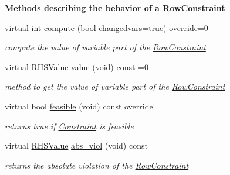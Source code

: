 \begin{Indent}\textbf{ Methods describing the behavior of a Row\+Constraint}\par
\begin{DoxyCompactItemize}
\item 
\mbox{\label{class_s_m_spp__di__unipi__it_1_1_row_constraint_a504d4e3e174c7a518cc66156a8a45ce5}} 
virtual int \mbox{\hyperlink{class_s_m_spp__di__unipi__it_1_1_row_constraint_a504d4e3e174c7a518cc66156a8a45ce5}{compute}} (bool changedvars=true) override=0
\begin{DoxyCompactList}\small\item\em compute the value of variable part of the \mbox{\hyperlink{class_s_m_spp__di__unipi__it_1_1_row_constraint}{Row\+Constraint}} \end{DoxyCompactList}\item 
virtual \mbox{\hyperlink{class_s_m_spp__di__unipi__it_1_1_row_constraint_a8813536ab3b13a81c8e83a999ade3bd8}{R\+H\+S\+Value}} \mbox{\hyperlink{class_s_m_spp__di__unipi__it_1_1_row_constraint_a42562ba0a608bdc52a80a2bb512d0603}{value}} (void) const =0
\begin{DoxyCompactList}\small\item\em method to get the value of variable part of the \mbox{\hyperlink{class_s_m_spp__di__unipi__it_1_1_row_constraint}{Row\+Constraint}} \end{DoxyCompactList}\item 
virtual bool \mbox{\hyperlink{class_s_m_spp__di__unipi__it_1_1_row_constraint_a508a569b1ce65668a4bbe261b0e2efab}{feasible}} (void) const override
\begin{DoxyCompactList}\small\item\em returns true if \mbox{\hyperlink{class_s_m_spp__di__unipi__it_1_1_constraint}{Constraint}} is feasible \end{DoxyCompactList}\item 
virtual \mbox{\hyperlink{class_s_m_spp__di__unipi__it_1_1_row_constraint_a8813536ab3b13a81c8e83a999ade3bd8}{R\+H\+S\+Value}} \mbox{\hyperlink{class_s_m_spp__di__unipi__it_1_1_row_constraint_a4207e8720a4543e4840b795a3d97b4e0}{abs\+\_\+viol}} (void) const
\begin{DoxyCompactList}\small\item\em returns the absolute violation of the \mbox{\hyperlink{class_s_m_spp__di__unipi__it_1_1_row_constraint}{Row\+Constraint}} \end{DoxyCompactList}\item 

\end{DoxyCompactItemize}
\end{Indent}
